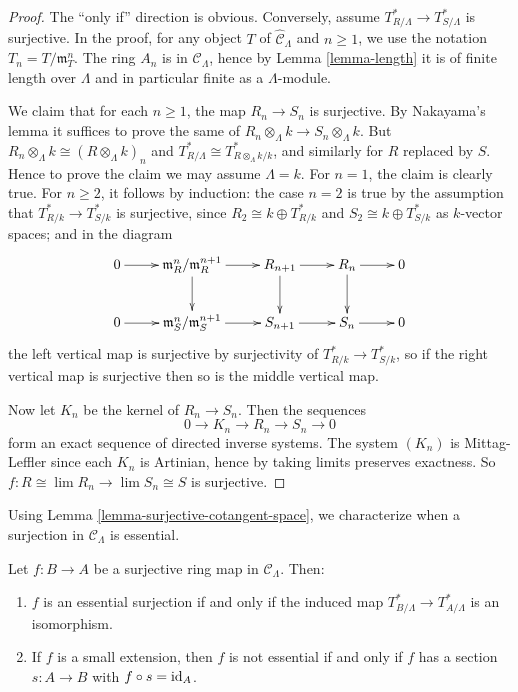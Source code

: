 \begin{proof} 
The ``only if'' direction is obvious.  Conversely, assume $T^*_{R/\Lambda} 
\rightarrow T^*_{S/\Lambda}$ is surjective. In the proof, for any object $T$ of 
$\widehat{\mathcal C}_{\Lambda}$ and $n \geq 1$, we use the notation $T_n = 
T/\mathfrak{m}_{T}^n$. The ring $A_{n}$ is in $\mathcal C_{\Lambda}$, hence by 
Lemma \ref{lemma-length} it is of finite length over $\Lambda$ and in 
particular finite as a $\Lambda$-module.    

\medskip \noindent
We claim that for each $n \geq 1$, the map $R_n \rightarrow S_n$ is surjective. 
 By Nakayama's lemma it suffices to prove the same of $R_n \otimes_{\Lambda} k 
\rightarrow S_n \otimes_{\Lambda} k$.  But $R_n \otimes_{\Lambda} k \cong (R 
\otimes_{\Lambda} k)_n$ and $T^*_{R/\Lambda} \cong T^*_{R \otimes_{\Lambda} 
k/k}$, and similarly for $R$ replaced by $S$. Hence to prove the claim we may 
assume $\Lambda = k$. For $n = 1$, the claim is clearly true.  For $n \geq 2$, 
it follows by induction: the case $n = 2$ is true by the assumption that 
$T^*_{R/k} \rightarrow T^*_{S/k}$ is surjective, since $R_2 \cong k \oplus 
T^*_{R/k}$ and $S_2 \cong k \oplus T^*_{S/k}$ as $k$-vector spaces; and in the 
diagram
\[
\xymatrix{
0 \ar[r] & \mathfrak{m}_{R}^n/\mathfrak{m}_{R}^{n+1} \ar[r] \ar[d] & R_{n+1} 
\ar[r] \ar[d] & R_{n} \ar[r] \ar[d] & 0 \\
0 \ar[r] & \mathfrak{m}_S^{n}/\mathfrak{m}_{S}^{n+1} \ar[r] & S_{n+1} \ar[r] & 
S_{n} \ar[r] & 0
}
\]
the left vertical map is surjective by surjectivity of $T^*_{R/k} \rightarrow 
T^*_{S/k}$, so if the right vertical map is surjective then so is the middle 
vertical map.

\medskip \noindent
Now let $K_n$ be the kernel of $R_n \rightarrow S_n$.  Then the sequences 
\[ 0 \rightarrow K_n \rightarrow R_n \rightarrow S_n \rightarrow 0 \]
form an exact sequence of directed inverse systems.  The system $(K_n)$ is 
Mittag-Leffler since each $K_n$ is Artinian, hence by \cite[Lemma 
7.75.4]{stacks-project} taking limits preserves exactness.  So $f: R \cong \lim 
R_n \rightarrow \lim S_n \cong S$ is surjective.
\end{proof}

\noindent
Using Lemma \ref{lemma-surjective-cotangent-space}, we characterize when a 
surjection in $\mathcal C_{\Lambda}$ is essential.
\begin{lemma}
\label{lemma-essential-surjection}
Let $f: B \rightarrow A$ be a surjective ring map in $\mathcal C_{\Lambda}$.  
Then:
\begin{enumerate}
\item $f$ is an essential surjection if and only if the induced map 
$T^*_{B/\Lambda} \rightarrow T^*_{A/\Lambda}$ is an isomorphism.
\item If $f$ is a small extension, then $f$ is not essential if and only if $f$ 
has a section $s: A \rightarrow B$ with $f \circ s = \textnormal{id}_A$.
\end{enumerate}
\end{lemma}

